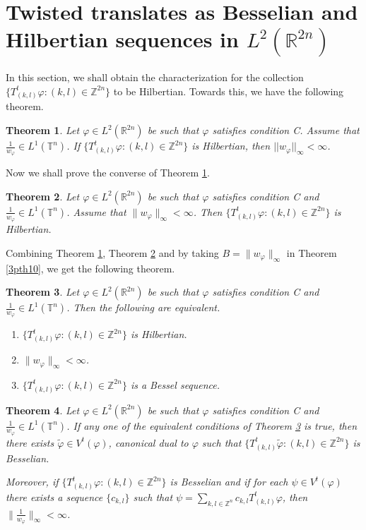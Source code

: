 \documentclass[a4paper,12pt,reqno]{amsart}
\theoremstyle{plain}
\newtheorem{thm}{Theorem}[section]
\numberwithin{equation}{section}
\theoremstyle{definition}
\begin{document}
\section{Twisted translates as Besselian and Hilbertian sequences in $L^{2}(\mathbb{R}^{2n})$}
In this section, we shall obtain the characterization for the collection $\{T_{(k,l)}^{t}\varphi:(k,l)\in \mathbb{Z}^{2n}\}$ to be Hilbertian. Towards this, we have the following theorem.
\begin{thm}\label{3pth6}
Let $\varphi\in L^{2}(\mathbb{R}^{2n})$ be such that $\varphi$ satisfies condition C. Assume that $\frac{1}{w_{\varphi}}\in L^{1}(\mathbb{T}^{n})$. If $\{T_{(k,l)}^{t}\varphi:(k,l)\in \mathbb{Z}^{2n}\}$ is Hilbertian, then $||w_{\varphi}||_{\infty}<\infty$.
\end{thm}
Now we shall prove the converse of Theorem \ref{3pth6}.
\begin{thm}\label{3pth7}
Let $\varphi\in L^{2}(\mathbb{R}^{2n})$ be such that $\varphi$ satisfies condition C and $\frac{1}{w_{\varphi}}\in L^{1}(\mathbb{T}^{n})$. Assume that $\|w_{\varphi}\|_{\infty}<\infty$. Then $\{T_{(k,l)}^{t}\varphi:(k,l)\in\mathbb{Z}^{2n}\}$ is Hilbertian.
\end{thm}
Combining Theorem \ref{3pth6}, Theorem \ref{3pth7} and by taking $B=\|w_{\varphi}\|_{\infty}$ in Theorem \ref{3pth10}, we get the following theorem.
\begin{thm}\label{3pth8}
Let $\varphi\in L^{2}(\mathbb{R}^{2n})$ be such that $\varphi$ satisfies condition C and $\frac{1}{w_{\varphi}}\in L^{1}(\mathbb{T}^{n})$. Then the following are equivalent.
\begin{enumerate}
\item [(a)] $\{T_{(k,l)}^{t}\varphi:(k,l)\in\mathbb{Z}^{2n}\}$ is Hilbertian.
\item [(b)] $\|w_{\varphi}\|_{\infty}<\infty$.
\item [(c)] $\{T_{(k,l)}^{t}\varphi:(k,l)\in\mathbb{Z}^{2n}\}$ is a Bessel sequence.
\end{enumerate}
\end{thm}
\begin{thm}\label{3pth9}
Let $\varphi\in L^{2}(\mathbb{R}^{2n})$ be such that $\varphi$ satisfies condition C and $\frac{1}{w_{\varphi}}\in L^{1}(\mathbb{T}^{n})$. If any one of the equivalent conditions of Theorem \ref{3pth8} is true, then there exists $\tilde{\varphi}\in V^{t}(\varphi)$, canonical dual to $\varphi$ such that $\{T_{(k,l)}^{t}\tilde{\varphi}:(k,l)\in\mathbb{Z}^{2n}\}$ is Besselian.

Moreover, if $\{T_{(k,l)}^{t}\varphi:(k,l)\in\mathbb{Z}^{2n}\}$ is Besselian and if for each $\psi\in V^{t}(\varphi)$ there exists a sequence $\{c_{k,l}\}$ such that $\psi=\sum\limits_{k,l\in\mathbb{Z}^{n}}c_{k,l}T_{(k,l)}^{t}\varphi$, then $\|\frac{1}{w_{\varphi}}\|_{\infty}<\infty$.
\end{thm}
\end{document}
